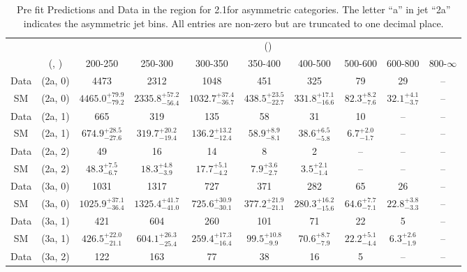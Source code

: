\begin{table}[h!]
\tiny
\centering
\caption{Pre fit Predictions and Data in the \mj region for 2.1\ifb for asymmetric categories. The letter ``a'' in jet \eg ``2a''  indicates the asymmetric jet bins. All entries are non-zero but are truncated to one decimal place.\label{tab:predallnaive_mu_comb_asym}}
\begin{tabular}
{cccccccccc}
	\hline\hline
	&	& \multicolumn{8}{c}{\scalht (\gev)}\\ 
	&	 (\njet, \nb) & 200-250 & 250-300 & 300-350 & 350-400 & 400-500 & 500-600 & 600-800 & 800-$\infty$ \\ [0.8ex] 
\hline
	Data & (2a, 0) & 4473 & 2312 & 1048 & 451 & 325 & 79 & 29 & -- \\[0.5ex] 
	SM & (2a, 0) & $4465.0^{+ 79.9 }_{- 79.2 }$ & $2335.8^{+ 57.2 }_{- 56.4 }$ & $1032.7^{+ 37.4 }_{- 36.7 }$ & $438.5^{+ 23.5 }_{- 22.7 }$ & $331.8^{+ 17.1 }_{- 16.6 }$ & $82.3^{+ 8.2 }_{- 7.6 }$ & $32.1^{+ 4.1 }_{- 3.7 }$ & -- \\[0.5ex] 
	Data & (2a, 1) & 665 & 319 & 135 & 58 & 31 & 10 & -- & -- \\[0.5ex] 
	SM & (2a, 1) & $674.9^{+ 28.5 }_{- 27.6 }$ & $319.7^{+ 20.2 }_{- 19.4 }$ & $136.2^{+ 13.2 }_{- 12.4 }$ & $58.9^{+ 8.9 }_{- 8.1 }$ & $38.6^{+ 6.5 }_{- 5.8 }$ & $6.7^{+ 2.0 }_{- 1.7 }$ & -- & -- \\[0.5ex] 
	Data & (2a, 2) & 49 & 16 & 14 & 8 & 2 & -- & -- & -- \\[0.5ex] 
	SM & (2a, 2) & $48.3^{+ 7.5 }_{- 6.7 }$ & $18.3^{+ 4.8 }_{- 3.9 }$ & $17.7^{+ 5.1 }_{- 4.2 }$ & $7.9^{+ 3.6 }_{- 2.7 }$ & $3.5^{+ 2.1 }_{- 1.4 }$ & -- & -- & -- \\[0.5ex] 
	Data & (3a, 0) & 1031 & 1317 & 727 & 371 & 282 & 65 & 26 & -- \\[0.5ex] 
	SM & (3a, 0) & $1025.9^{+ 37.1 }_{- 36.4 }$ & $1325.4^{+ 41.7 }_{- 41.0 }$ & $725.6^{+ 30.9 }_{- 30.1 }$ & $377.2^{+ 21.9 }_{- 21.1 }$ & $280.3^{+ 16.2 }_{- 15.6 }$ & $64.6^{+ 7.7 }_{- 7.1 }$ & $22.8^{+ 3.8 }_{- 3.3 }$ & -- \\[0.5ex] 
	Data & (3a, 1) & 421 & 604 & 260 & 101 & 71 & 22 & 5 & -- \\[0.5ex] 
	SM & (3a, 1) & $426.5^{+ 22.0 }_{- 21.1 }$ & $604.1^{+ 26.3 }_{- 25.4 }$ & $259.4^{+ 17.3 }_{- 16.4 }$ & $99.5^{+ 10.8 }_{- 9.9 }$ & $70.6^{+ 8.7 }_{- 7.9 }$ & $22.2^{+ 5.1 }_{- 4.4 }$ & $6.3^{+ 2.6 }_{- 1.9 }$ & -- \\[0.5ex] 
	Data & (3a, 2) & 122 & 163 & 77 & 38 & 16 & 5 & -- & -- \\[0.5ex] 

\end{tabular}
\end{table}
